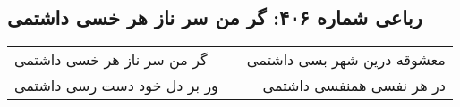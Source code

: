 \begin{center}
\section*{رباعی شماره ۴۰۶: گر من سر ناز هر خسی داشتمی}
\label{sec:sh406}
\begin{longtable}{l p{0.5cm} r}
گر من سر ناز هر خسی داشتمی
&&
معشوقه درین شهر بسی داشتمی
\\
ور بر دل خود دست رسی داشتمی
&&
در هر نفسی همنفسی داشتمی
\\
\end{longtable}
\end{center}
